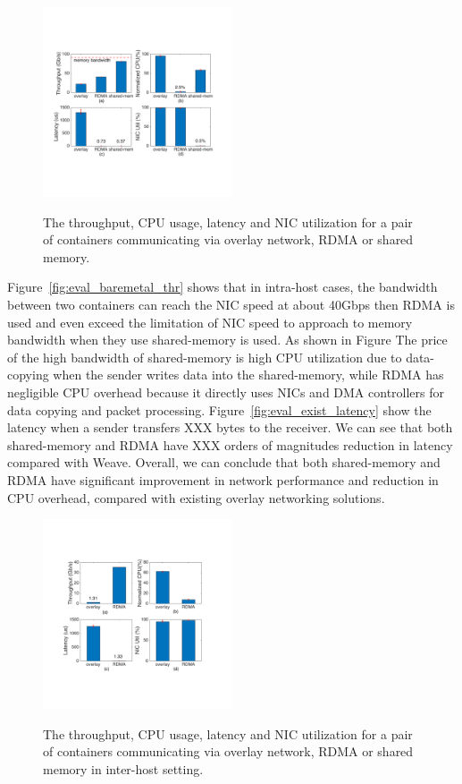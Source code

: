      \begin{figure}[ht]
     \centering 
     \includegraphics[width=0.5\textwidth]{figures/motivation/mot_rdma_shm.pdf}      
     \label{fig:mot_rdma_shm}
     \caption{The throughput, CPU usage, latency and NIC utilization for a pair of 
     containers communicating via overlay network, RDMA or shared memory.} 
     \end{figure}

Figure~\ref{fig:eval_baremetal_thr} shows that in intra-host cases, the bandwidth between two
containers can reach the NIC speed at about 40Gbps then RDMA is used and 
even exceed the limitation of NIC speed to approach to memory bandwidth when
they use shared-memory is used. As shown in Figure The price of the high bandwidth of shared-memory is high CPU utilization due to data-copying when the sender writes data into
the shared-memory, while RDMA has negligible CPU overhead because it directly uses NICs and DMA controllers for data copying and packet processing.
Figure~\ref{fig:eval_exist_latency} show the latency when a sender 
transfers XXX bytes to the receiver. We can see that both shared-memory
and RDMA have XXX orders of magnitudes reduction in latency compared with Weave.
Overall, we can conclude that both shared-memory and RDMA have 
significant improvement in network performance and reduction in CPU overhead,
compared with existing overlay networking solutions.

     \begin{figure}[ht]
     \centering 
     \includegraphics[width=0.5\textwidth]{figures/motivation/mot_rdma_inter.pdf}      
     \label{fig:mot_rdma_inter}
     \caption{The throughput, CPU usage, latency and NIC utilization for a pair of 
     containers communicating via overlay network, RDMA or shared memory in 
     inter-host setting.} 
     \end{figure}
     
